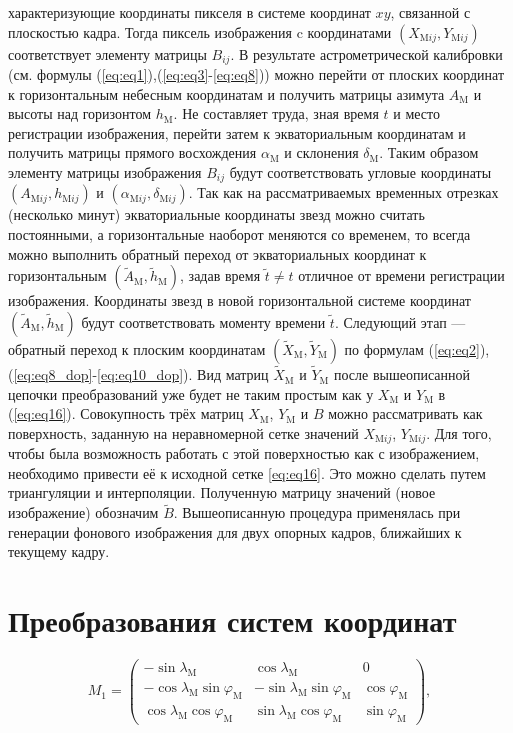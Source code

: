 \documentclass[12pt,a4paper]{article}
\begin{document}
характеризующие координаты пикселя в системе координат $xy$, связанной с плоскостью кадра. Тогда пиксель изображения c координатами  $(X_{\text{M}ij},Y_{\text{M}ij})$ соответствует элементу матрицы $B_{ij}$. В результате астрометрической калибровки (см. формулы (\ref{eq:eq1}),(\ref{eq:eq3}-\ref{eq:eq8})) можно перейти от плоских координат к горизонтальным небесным координатам и получить матрицы азимута $A_{\text{M}}$ и высоты над горизонтом $h_{\text{M}}$. Не составляет труда, зная время $t$ и место регистрации изображения,	перейти затем к экваториальным координатам и получить матрицы прямого восхождения $\alpha_{\text{M}}$ и склонения $\delta_{\text{M}}$. Таким образом элементу матрицы изображения $B_{ij}$ будут соответствовать угловые координаты $(A_{\text{M}ij},h_{\text{M}ij})$ и $(\alpha_{\text{M}ij},\delta_{\text{M}ij})$. Так как на рассматриваемых временных отрезках (несколько минут) экваториальные координаты звезд можно считать постоянными, а горизонтальные наоборот меняются со временем, то всегда можно выполнить обратный переход от экваториальных координат к горизонтальным $(\tilde{A}_{\text{M}},\tilde{h}_{\text{M}})$, задав время $\tilde{t}\neq t$ отличное от времени регистрации изображения. Координаты звезд в новой горизонтальной системе координат $(\tilde{A}_{\text{M}},\tilde{h}_{\text{M}})$ будут соответствовать моменту времени $\tilde{t}$. Следующий этап --- обратный переход к плоским координатам $(\tilde{X}_{\text{M}},\tilde{Y}_{\text{M}})$ по формулам (\ref{eq:eq2}),(\ref{eq:eq8_dop}-\ref{eq:eq10_dop}). Вид матриц $\tilde{X}_{\text{M}}$ и $\tilde{Y}_{\text{M}}$ после вышеописанной цепочки преобразований уже будет не таким простым как у $X_{\text{M}}$ и $Y_{\text{M}}$ в (\ref{eq:eq16}). Совокупность трёх матриц $X_{\text{M}}$, $Y_{\text{M}}$ и $B$ можно рассматривать как поверхность, заданную на неравномерной сетке значений $X_{\text{M}ij}$, $Y_{\text{M}ij}$. Для того, чтобы была возможность работать с этой поверхностью как с изображением, необходимо привести её к исходной сетке \ref{eq:eq16}. Это можно сделать путем триангуляции и интерполяции. Полученную матрицу значений (новое изображение) обозначим $\tilde{B}$. Вышеописанную процедура применялась при генерации фонового изображения для двух опорных кадров, ближайших к текущему кадру. 

\section{Преобразования систем координат} \label{app:modelling1}
\begin{equation}\label{eq:mod6}
M_1=\begin{pmatrix} -\sin{\lambda_\text{M}} & \cos{\lambda_\text{M}} & 0 \\ -\cos{\lambda_\text{M}}\sin{\varphi_\text{M}} & -\sin{\lambda_\text{M}}\sin{\varphi_\text{M}} & \cos{\varphi_\text{M}}\\ \cos{\lambda_\text{M}}\cos{\varphi_\text{M}} & \sin{\lambda_\text{M}}\cos{\varphi_\text{M}} & \sin{\varphi_\text{M}} \end{pmatrix},
\end{equation}
\end{document}
